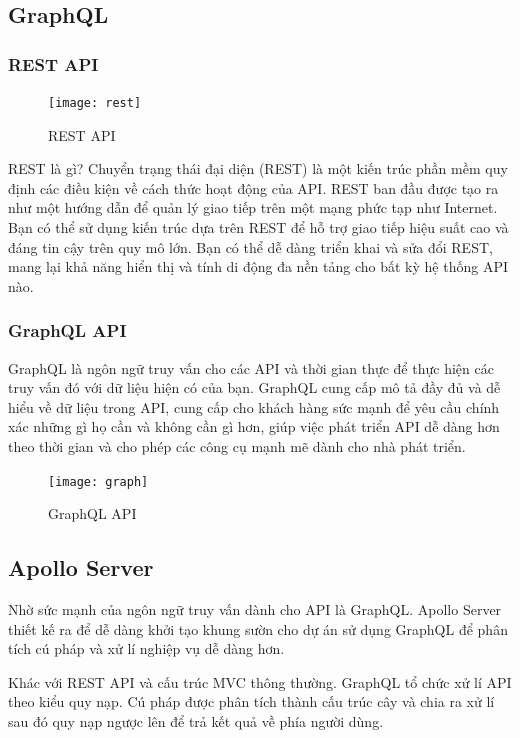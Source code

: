 {{\subsection{GraphQL}

\subsubsection{REST API \cite{web:rest}}

\begin{figure}[h]
	\caption{REST API}
	\centering
	\texttt{[image: rest]}
	\label{fig:ill:rest}
\end{figure}
REST là gì?
Chuyển trạng thái đại diện (REST) là một kiến trúc phần mềm quy định các điều kiện về cách thức hoạt động của API. REST ban đầu được tạo ra như một hướng dẫn để quản lý giao tiếp trên một mạng phức tạp như Internet. Bạn có thể sử dụng kiến trúc dựa trên REST để hỗ trợ giao tiếp hiệu suất cao và đáng tin cậy trên quy mô lớn. Bạn có thể dễ dàng triển khai và sửa đổi REST, mang lại khả năng hiển thị và tính di động đa nền tảng cho bất kỳ hệ thống API nào.


\subsubsection{GraphQL API}

GraphQL là ngôn ngữ truy vấn cho các API và thời gian thực để thực hiện các truy vấn đó với dữ liệu hiện có của bạn. GraphQL cung cấp mô tả đầy đủ và dễ hiểu về dữ liệu trong API, cung cấp cho khách hàng sức mạnh để yêu cầu chính xác những gì họ cần và không cần gì hơn, giúp việc phát triển API dễ dàng hơn theo thời gian và cho phép các công cụ mạnh mẽ dành cho nhà phát triển.

\begin{figure}[h]
	\caption{GraphQL API}
	\centering
	\texttt{[image: graph]}
	\label{fig:ill:graph}
\end{figure}

\pagebreak

\subsection{Apollo Server}
Nhờ sức mạnh của ngôn ngữ truy vấn dành cho API là GraphQL. Apollo Server thiết kế ra để dễ dàng khởi tạo khung sườn cho dự án sử dụng GraphQL để phân tích cú pháp và xử lí nghiệp vụ dễ dàng hơn.

Khác với REST API và cấu trúc MVC thông thường. GraphQL tổ chức xử lí API theo kiểu quy nạp. Cú pháp được phân tích thành cấu trúc cây và chia ra xử lí sau đó quy nạp ngược lên để trả kết quả về phía người dùng.

}}
